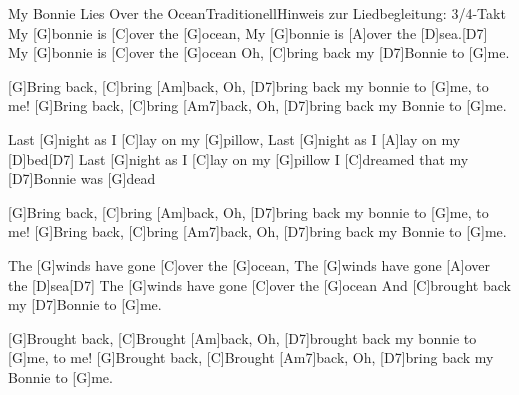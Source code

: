 \documentclass[../main.tex]{subfiles}
\begin{document}
\begin{song}{My Bonnie Lies Over the Ocean}{Traditionell}{Hinweis zur Liedbegleitung: 3/4-Takt}
My [G]bonnie is [C]over the [G]ocean,
My [G]bonnie is [A]over the [D]sea.[D7]{\hh}
My [G]bonnie is [C]over the [G]ocean
Oh, [C]bring back my [D7]Bonnie to [G]me.

[G]Bring back, [C]bring [Am]back,
Oh, [D7]bring back my bonnie to [G]me, to me!
[G]Bring back, [C]bring [Am7]back,
Oh, [D7]bring back my Bonnie to [G]me.

Last [G]night as I [C]lay on my [G]pillow,
Last [G]night as I [A]lay on my [D]bed[D7]{\hh}
Last [G]night as I [C]lay on my [G]pillow
I [C]dreamed that my [D7]Bonnie was [G]dead

[G]Bring back, [C]bring [Am]back,
Oh, [D7]bring back my bonnie to [G]me, to me!
[G]Bring back, [C]bring [Am7]back,
Oh, [D7]bring back my Bonnie to [G]me.

The [G]winds have gone [C]over the [G]ocean,
The [G]winds have gone [A]over the [D]sea[D7]{\hh}
The [G]winds have gone [C]over the [G]ocean
And [C]brought back my [D7]Bonnie to [G]me.

[G]Brought back, [C]Brought [Am]back,
Oh, [D7]brought back my bonnie to [G]me, to me!
[G]Brought back, [C]Brought [Am7]back,
Oh, [D7]bring back my Bonnie to [G]me.
\end{song}
\end{document}
